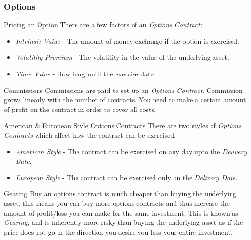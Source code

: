 \documentclass[11pt,a4paper]{article}
\begin{document}
\subsubsection{Options} \label{sec_Options}

  \begin{proposition}{Pricing an Option}
    There are a few factors of an \textit{Options Contract}:
    \begin{itemize}
      \item \textit{Intrinsic Value} - The amount of money exchange if the option is exercised.
      \item \textit{Volatility Premium} - The volatility in the value of the underlying asset.
      \item \textit{Time Value} - How long until the exercise date
    \end{itemize}
  \end{proposition}

  \begin{remark}{Commissions}
    Commissions are paid to set up an \textit{Options Contract}. Commission grows linearly with the number of contracts. You need to make a certain amount of profit on the contract in order to cover all costs.
  \end{remark}

  \begin{remark}{American \& European Style Options Contracts}
    There are two styles of \textit{Options Contracts} which affect how the contract can be exercised.
    \begin{itemize}
      \item \textit{American Style} - The contract can be exercised on \underline{any day} upto the \textit{Delivery Date}.
      \item \textit{European Style} - The contract can be exercised \underline{only} on the \textit{Delivery Date}.
    \end{itemize}
  \end{remark}

  \begin{definition}{Gearing}
    Buy an options contract is much cheaper than buying the underlying asset, this means you can buy more options contracts and thus increase the amount of profit/loss you can make for the same investment. This is known as \textit{Gearing}, and is inherently more risky than buying the underlying asset as if the price does not go in the direction you desire you loss your entire investment.
  \end{definition}
\end{document}
